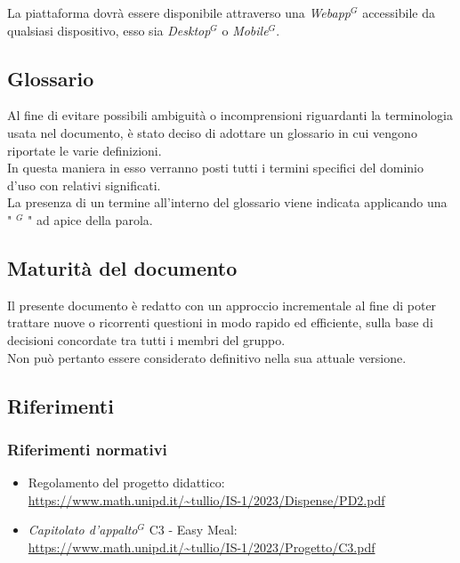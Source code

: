     La piattaforma dovrà essere disponibile attraverso una \emph{Webapp}$^{G}$ accessibile da qualsiasi dispositivo, esso sia \emph{Desktop}$^{G}$ o \emph{Mobile}$^{G}$.


    \subsection{Glossario}

    Al fine di evitare possibili ambiguità o incomprensioni riguardanti la terminologia usata nel documento, è stato deciso di adottare un glossario in cui vengono riportate le varie definizioni. \\
    In questa maniera in esso verranno posti tutti i termini specifici del dominio d’uso con relativi significati. \\
    La presenza di un termine all’interno del glossario viene indicata applicando una " $^{G}$ " ad apice della parola.


    \subsection{Maturità del documento}

    Il presente documento è redatto con un approccio incrementale al fine di poter trattare nuove o ricorrenti questioni in modo rapido ed efficiente, sulla base di decisioni concordate tra tutti i membri del gruppo. \\
    Non può pertanto essere considerato definitivo nella sua attuale versione.

    \subsection{Riferimenti}

        \subsubsection{Riferimenti normativi}

        \begin{itemize}
            \item Regolamento del progetto didattico: \\
            \url{https://www.math.unipd.it/~tullio/IS-1/2023/Dispense/PD2.pdf}
          \item \emph{Capitolato d’appalto}$^{G}$ C3 - Easy Meal: \\
            \url{https://www.math.unipd.it/~tullio/IS-1/2023/Progetto/C3.pdf}
        \end{itemize}

